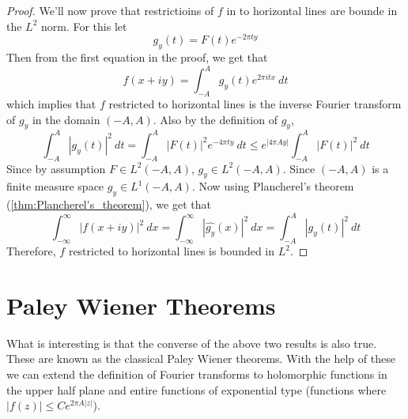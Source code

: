 \begin{proof}
  We'll now prove that restrictioins of $f$ in to horizontal lines are bounde in the $L^2$ norm. For this let $$g_y(t) = F(t)e^{-2\pi ty}$$
  Then from the first equation in the proof, we get that $$f(x+iy) = \int_{-A}^A g_y(t) e^{2\pi itx} \ dt$$
which implies that $f$ restricted to horizontal lines is the inverse Fourier transform of $g_y$ in the domain $(-A, A)$. Also by the definition of $g_y$, $$\int_{-A}^A \left|g_y(t)\right|^2 \ dt = \int_{-A}^A \left|F(t)\right|^2 e^{-4\pi t y} \ dt \le e^{\left|4\pi Ay\right|}\int_{-A}^A \left|F(t)\right|^2 \ dt$$
  Since by assumption $F \in L^2(-A, A)$, $g_y \in L^2(-A, A)$. Since $(-A, A)$ is a finite measure space $g_y \in L^1(-A, A)$. Now using Plancherel's theorem (\autoref{thm:Plancherel's_theorem}), we get that $$\int_{-\infty}^\infty |f(x+iy)|^2 \ dx = \int_{-\infty}^\infty |\widehat{g_y}(x)|^2 \ dx = \int_{-A}^A |g_y(t)|^2 \ dt $$
  Therefore, $f$ restricted to horizontal lines is bounded in $L^2$.
\end{proof}

\section{Paley Wiener Theorems}
What is interesting is that the converse of the above two results is also true. These are known as the classical Paley Wiener theorems. With the help of these we can extend the definition of Fourier transforms to holomorphic functions in the upper half plane and entire functions of exponential type (functions where $|f(z)| \le Ce^{2\pi A |z|}$).

